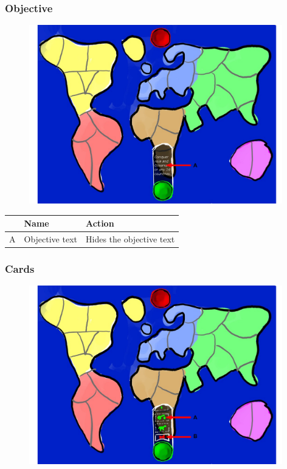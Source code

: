\documentclass[12pt,a4paper]{article}
\begin{document}
\subsubsection{Objective}\label{mock:722}

\begin{figure}[H]
  \centering
  \includegraphics[width=11cm]{pic/mocks/2-2.pdf}
\end{figure}

\begin{table}[H]
\small
\centering
\begin{tabular}{c|p{5cm}|p{7cm}}
& Name & Action \\ \hline\hline
A
&Objective text
&Hides the objective text
\end{tabular}
\end{table}

\newpage
\subsubsection{Cards}\label{mock:723}

\begin{figure}[H]
  \centering
  \includegraphics[width=11cm]{pic/mocks/2-3.pdf}
\end{figure}
\end{document}
